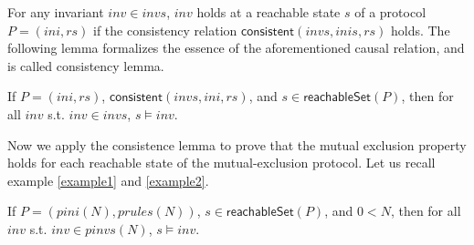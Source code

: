 \documentclass[final]{IEEEtran}
\newcommand\cai[1]{\textcolor{blue}{ #1} }
\begin{document}



For any invariant $inv \in invs$, $inv$ holds at a reachable state $s$  of a protocol $P=(ini,rs)$  if the consistency relation
$\mathsf{consistent}( invs, inis, rs)$ holds. %
The following lemma formalizes the essence of the aforementioned causal relation, and is called consistency lemma.

\begin{lemma}\label{consistentLemma}%
 If $P=(ini,rs)$, $\mathsf{consistent}( invs, ini, rs)$, and $s  \in \mathsf{reachableSet}(P)$, %
 then   for all $inv$ s.t. $inv \in invs$, $s \models inv $.
\end{lemma}



Now we apply the consistence lemma to prove that the mutual exclusion property holds for each reachable state of the mutual-exclusion protocol. Let us recall example \ref{example1} and  \ref{example2}.
\begin{lemma} \label{caseSimp}
  If $ P=(pini(N),prules(N))$,  $s \in \mathsf{reachableSet}(P)$, and $0<N$,
  then for all $inv$ s.t. $inv \in pinvs(N)$, $s\models inv $.
\end{lemma}
\end{document}
